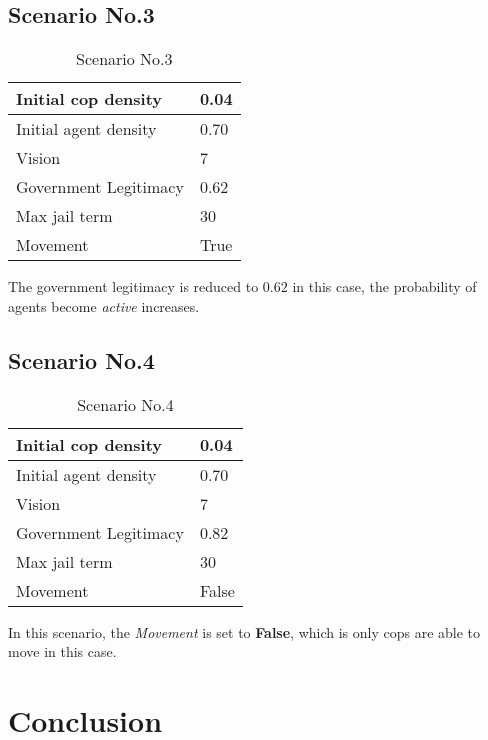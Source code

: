 \documentclass[11pt]{article}
\begin{document}
      \subsection{Scenario No.3}
      \begin{table}[h]
        \begin{center}
          \begin{tabular}{|l|l|}
          \hline
            Initial cop density & 0.04 \\
          \hline\hline
            Initial agent density & 0.70 \\
          \hline
            Vision & 7 \\
          \hline
            Government Legitimacy & 0.62 \\
          \hline
            Max jail term & 30 \\
          \hline
            Movement & True \\
          \hline
          \end{tabular}
          \caption{Scenario No.3}\label{table3}
        \end{center}
      \end{table}
      The government legitimacy is reduced to $0.62$ in this case, the probability
      of agents become \textit{active} increases.

      \subsection{Scenario No.4}
      \begin{table}[h]
        \begin{center}
          \begin{tabular}{|l|l|}
          \hline
            Initial cop density & 0.04 \\
          \hline\hline
            Initial agent density & 0.70 \\
          \hline
            Vision & 7 \\
          \hline
            Government Legitimacy & 0.82 \\
          \hline
            Max jail term & 30 \\
          \hline
            Movement & False \\
          \hline
          \end{tabular}
          \caption{Scenario No.4}\label{table4}
        \end{center}
      \end{table}
      In this scenario, the \textit{Movement} is set to \textbf{False}, which is
      only cops are able to move in this case.

    \section{Conclusion}
    
\end{document}
